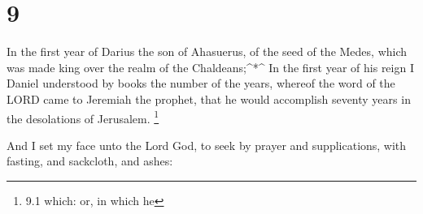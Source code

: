 \hypertarget{section-8}{%
\section{9}\label{section-8}}

 In the first year of Darius the son of Ahasuerus, of the
seed of the Medes, which was made king over the realm of the
Chaldeans;\^{}*\^{}  In the first year of his reign I Daniel
understood by books the number of the years, whereof the word of the
LORD came to Jeremiah the prophet, that he would accomplish seventy
years in the desolations of Jerusalem. \footnote{9.1 which: or, in which
  he}

 And I set my face unto the Lord God, to seek by prayer and
supplications, with fasting, and sackcloth, and ashes:

